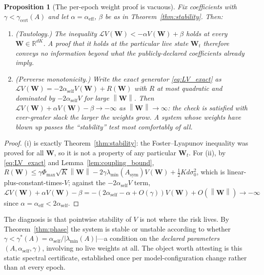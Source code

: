 \documentclass[12pt]{article}
\theoremstyle{plain}
\newtheorem{proposition}[theorem]{Proposition}
\theoremstyle{definition}
\newcommand{\R}{\mathbb{R}}
\newcommand{\Lgen}{\mathcal{L}}
\newcommand{\W}{\mathbf{W}}
\newcommand{\norm}[1]{\left\lVert #1 \right\rVert}
\newcommand{\abs}[1]{\left| #1 \right|}
\begin{document}
\begin{proposition}[The per-epoch weight proof is vacuous]
\label{prop:tautology}
Fix coefficients with $\gamma<\gamma_{\mathrm{cert}}(A)$ and let
$\alpha=\alpha_{\mathrm{eff}}$, $\beta$ be as in Theorem~\ref{thm:stability}.
Then:
\begin{enumerate}[label=(\roman*)]
  \item \emph{(Tautology.)} The inequality $\Lgen V(\W)<-\alpha V(\W)+\beta$
    holds at \emph{every} $\W\in\R^{dK}$.  A proof that it holds at the
    particular live state $\W_t$ therefore conveys no information beyond
    what the publicly-declared coefficients already imply.
  \item \emph{(Perverse monotonicity.)} Write the exact generator
    \eqref{eq:LV_exact} as $\Lgen V(\W)=-2\alpha_{\mathrm{self}}V(\W)+R(\W)$
    with $R$ at most quadratic and dominated by $-2\alpha_{\mathrm{self}}V$
    for large $\norm{\W}$.  Then $\Lgen V(\W)+\alpha V(\W)-\beta\to-\infty$
    as $\norm{\W}\to\infty$: the check is satisfied with ever-greater slack
    the larger the weights grow.  A system whose weights have blown up
    passes the ``stability'' test most comfortably of all.
\end{enumerate}
\end{proposition}

\begin{proof}
(i) is exactly Theorem~\ref{thm:stability}: the Foster--Lyapunov inequality
was proved for all $\W$, so it is not a property of any particular $\W_t$.
For (ii), by \eqref{eq:LV_exact} and Lemma~\ref{lem:coupling_bound},
$R(\W)\le\gamma\Phi_{\max}\sqrt K\norm{\W}-2\gamma\lambda_{\min}(A_{\mathrm{sym}})V(\W)+\tfrac12Kd\sigma_0^2$,
which is linear-plus-constant-times-$V$; against the $-2\alpha_{\mathrm{self}}V$
term, $\Lgen V(\W)+\alpha V(\W)-\beta=-(2\alpha_{\mathrm{self}}-\alpha+O(\gamma))V(\W)+O(\norm{\W})\to-\infty$
since $\alpha=\alpha_{\mathrm{eff}}<2\alpha_{\mathrm{self}}$.
\end{proof}

The diagnosis is that pointwise stability of $V$ is not where the risk
lives.  By Theorem~\ref{thm:phase} the system is stable or unstable
according to whether $\gamma<\gamma^*(A)=\alpha_{\mathrm{self}}/\abs{\lambda_{\min}(A)}$---a
condition on the \emph{declared parameters} $(A,\alpha_{\mathrm{self}},\gamma)$,
involving no live weights at all.  The object worth attesting is this
static spectral certificate, established once per model-configuration change
rather than at every epoch.
\end{document}

